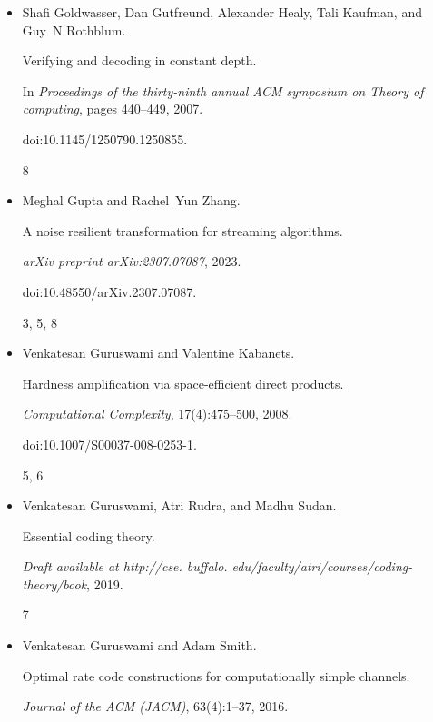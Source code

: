 \begin{itemize}
doi:10.1561/0400000079.


3




\item[] 
[11]

Shafi Goldwasser, Dan Gutfreund, Alexander Healy, Tali Kaufman, and Guy N
Rothblum.


Verifying and decoding in constant depth.


In \emph{Proceedings of the thirty-ninth annual ACM symposium on
Theory of computing}, pages 440–449, 2007.


doi:10.1145/1250790.1250855.


8




\item[] 
[12]

Meghal Gupta and Rachel Yun Zhang.


A noise resilient transformation for streaming algorithms.


\emph{arXiv preprint arXiv:2307.07087}, 2023.


doi:10.48550/arXiv.2307.07087.


3, 5, 8




\item[] 
[13]

Venkatesan Guruswami and Valentine Kabanets.


Hardness amplification via space-efficient direct products.


\emph{Computational Complexity}, 17(4):475–500, 2008.


doi:10.1007/S00037-008-0253-1.


5, 6




\item[] 
[14]

Venkatesan Guruswami, Atri Rudra, and Madhu Sudan.


Essential coding theory.


\emph{Draft available at http://cse. buffalo.
edu/faculty/atri/courses/coding-theory/book}, 2019.


7




\item[] 
[15]

Venkatesan Guruswami and Adam Smith.


Optimal rate code constructions for computationally simple channels.


\emph{Journal of the ACM (JACM)}, 63(4):1–37, 2016.



\end{itemize}
